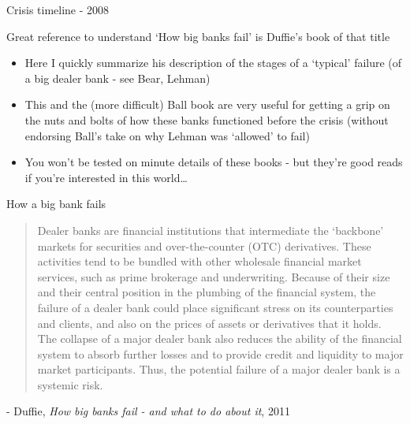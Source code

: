 \begin{frame}{Crisis timeline - 2008}

Great reference to understand `How big banks fail' is Duffie's book of that title
\begin{itemize}
\item	Here I quickly summarize his description of the stages of a `typical' failure (of a big dealer bank - see Bear, Lehman)
\item	This and the (more difficult) Ball book are very useful for getting a grip on the nuts and bolts of how these banks functioned before the crisis (without endorsing Ball's take on why Lehman was `allowed' to fail)
\item	You won't be tested on minute details of these books - but they're good reads if you're interested in this world\ldots
\end{itemize}

\end{frame}



\begin{frame}{How a big bank fails}


\begin{quote}
Dealer banks are financial institutions that intermediate the `backbone' markets for securities and over-the-counter (OTC) derivatives. These activities tend to be bundled with other
wholesale financial market services, such as prime brokerage and underwriting. Because of
their size and their central position in the plumbing of the financial system, the failure of
a dealer bank could place significant stress on its counterparties and clients, and also on
the prices of assets or derivatives that it holds. The collapse of a major dealer bank also
reduces the ability of the financial system to absorb further losses and to provide credit and
liquidity to major market participants. Thus, the potential failure of a major dealer bank is
a systemic risk.
\end{quote}
\begin{center}
- Duffie, \emph{How big banks fail - and what to do about it}, 2011
\end{center}

\end{frame}


